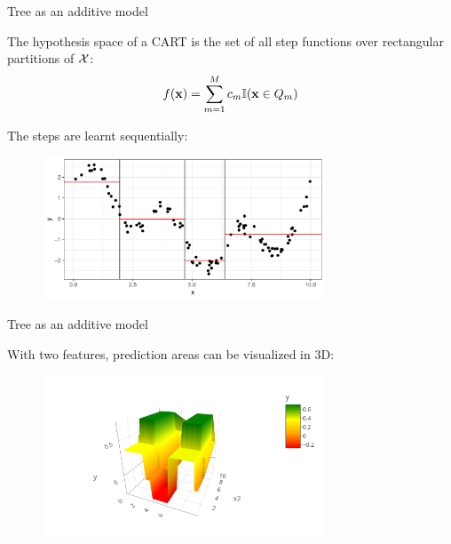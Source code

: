 \documentclass[11pt,compress,t,notes=noshow, xcolor=table]{beamer}
\begin{document}
\begin{vbframe}{Tree as an additive model}

The hypothesis space of a CART is the set of all step functions over rectangular partitions of $\mathcal{X}$:
\begin{align*}
    f(\mathbf{x}) = \sum_{m=1}^M c_m \mathbb{I}(\mathbf{x} \in Q_m)
\end{align*}

The steps are learnt sequentially:

\begin{figure} 
\includegraphics[width=0.75\textwidth, keepaspectratio]{figure/cart_intro_regression_tree_wide.pdf}
\end{figure}

\end{vbframe}


\begin{vbframe}{Tree as an additive model}

With two features, prediction areas can be visualized in 3D:
\lz
\begin{figure} 
\includegraphics[width=0.75\textwidth, keepaspectratio]{figure_man/tree-contin-surface3d.png}
\end{figure}

\end{vbframe}
\end{document}
